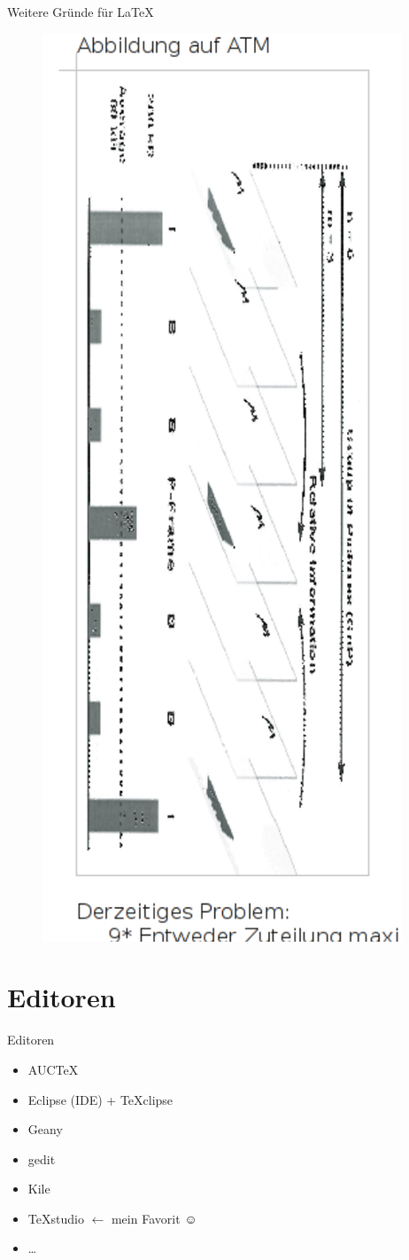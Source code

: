 \begin{frame}{Weitere Gründe für \LaTeX}
\begin{figure}[tbph]
\centering
\includegraphics[height=0.75\textheight]{./pictures/hoeller3}
\label{fig:hoeller3}
\end{figure}
\end{frame}

\section{Editoren}
\begin{frame}{Editoren}
 \begin{itemize}[<+->]
 	\item AUCTeX
 	\item Eclipse (IDE) + TeXclipse
 	\item Geany
 	\item gedit
 	\item Kile
 	\item TeXstudio $ \leftarrow $ mein Favorit $\smiley$
 	\item \ldots
 \end{itemize}

\end{frame}